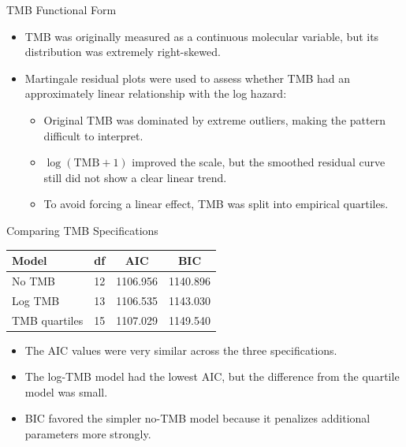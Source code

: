 \documentclass{beamer}
\begin{document}
\begin{frame}{TMB Functional Form}
\begin{itemize}
    \item TMB was originally measured as a continuous molecular variable, but its distribution was extremely right-skewed. 
    \item Martingale residual plots were used to assess whether TMB had an approximately linear relationship with the log hazard:
    \begin{itemize}
        \item Original TMB was dominated by extreme outliers, making the pattern difficult to interpret.
        \item $\log(\text{TMB}+1)$ improved the scale, but the smoothed residual curve still did not show a clear linear trend.
        \item To avoid forcing a linear effect, TMB was split into empirical quartiles.
    \end{itemize}
\end{itemize}
\end{frame}

\begin{frame}{Comparing TMB Specifications}
\centering
\begin{tabular}{lccc}
    \toprule
    Model & df & AIC & BIC \\
    \midrule
    No TMB & 12 & 1106.956 & 1140.896 \\
    Log TMB & 13 & 1106.535 & 1143.030 \\
    TMB quartiles & 15 & 1107.029 & 1149.540 \\
    \bottomrule
\end{tabular}

\vspace{0.3cm}

\begin{itemize}
    \item The AIC values were very similar across the three specifications.
    \item The log-TMB model had the lowest AIC, but the difference from the quartile model was small.
    \item BIC favored the simpler no-TMB model because it penalizes additional parameters more strongly.
\end{itemize}
\end{frame}
\end{document}
